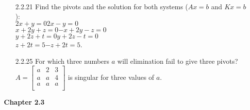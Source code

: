 \documentclass[10pt,twoside,reqno]{article}
\begin{document}
\begin{enumerate}
\item[2.2.21]Find the pivots and the solution for both systems ($Ax = b$ and $Kx = b$): \\
\hspace{122pt}$2x+ y      =0$\hspace{60pt}$2x- y      =0$\\
\hspace{105pt}$ x+2y+ z   =0$\hspace{35pt}$-x+2y- z   =0$\\
\hspace{107pt}$    y+2z+ t=0$\hspace{46pt}$    y+2z- t=0$\\
\hspace{125pt}$       z+2t=5$\hspace{55pt}$     - z+2t=5$.\\
\vspace{3mm}
\item[2.2.25]For which three numbers $a$ will elimination fail to give three pivots? \\
\vspace{3mm}
\hspace{95pt}
$
$$
A=
\begin{bmatrix}
a&2&3\\
a&a&4\\
a&a&a\\
\end{bmatrix}
$$
$
is singular for three values of $a$.
\vspace{3mm}
\end{enumerate}
\vspace{5mm}
\textbf{Chapter 2.3}
\end{document}
